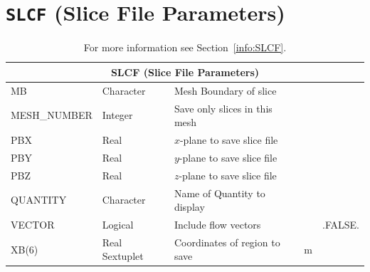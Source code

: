 \documentclass[11pt]{book}
\begin{document}

\vspace{\baselineskip}

\vfill

\section{\texorpdfstring{{\tt SLCF}}{SLCF} (Slice File Parameters)}

\hspace{1in}

\begin{table}[H]
\caption{For more information see Section~\ref{info:SLCF}.}\label{tbl:SLCF}
\noindent
\begin{tabular*}{\textwidth}{@{\extracolsep{\fill}}|l|l|l|l|l|}
\hline
\multicolumn{5}{|c|}{{\ct SLCF} (Slice File Parameters)} \\ \hline \hline
{\ct MB      }          & Character         & Mesh Boundary of  slice           &           &     \\ \hline
{\ct MESH\_NUMBER}      & Integer           & Save only slices in this mesh     &           &     \\ \hline
{\ct PBX     }          & Real              & $x$-plane to save slice file      &           &     \\ \hline
{\ct PBY     }          & Real              & $y$-plane to save slice file      &           &     \\ \hline
{\ct PBZ     }          & Real              & $z$-plane to save slice file      &           &     \\ \hline
{\ct QUANTITY}          & Character         & Name of Quantity to display       &           &     \\ \hline
{\ct VECTOR    }        & Logical           & Include flow vectors              &           & {\ct .FALSE.}    \\ \hline
{\ct XB(6)}             & Real Sextuplet    & Coordinates of region to save     & m         &     \\ \hline
\end{tabular*}
\end{table}

\vspace{\baselineskip}
\end{document}
